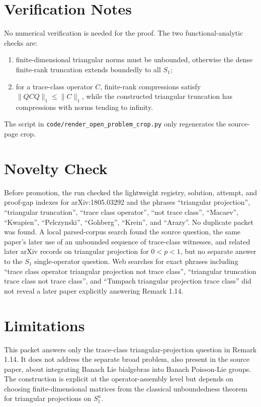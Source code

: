 \documentclass[11pt]{amsart}
\begin{document}
\section*{Verification Notes}

No numerical verification is needed for the proof. The two functional-analytic
checks are:
\begin{enumerate}
\item finite-dimensional triangular norms must be unbounded, otherwise the
dense finite-rank truncation extends boundedly to all \(S_1\);
\item for a trace-class operator \(C\), finite-rank compressions satisfy
\(\|Q C Q\|_1\le \|C\|_1\), while the constructed triangular truncation has
compressions with norms tending to infinity.
\end{enumerate}
The script in \texttt{code/render\_open\_problem\_crop.py} only regenerates
the source-page crop.

\section*{Novelty Check}

Before promotion, the run checked the lightweight registry, solution, attempt,
and proof-gap indexes for arXiv:1805.03292 and the phrases
``triangular projection'', ``triangular truncation'', ``trace class operator'',
``not trace class'', ``Macaev'', ``Kwapien'', ``Pelczynski'', ``Gohberg'',
``Krein'', and ``Arazy''. No duplicate packet was found. A local parsed-corpus
search found the source question, the same paper's later use of an unbounded
sequence of trace-class witnesses, and related later arXiv records on
triangular projection for \(0<p<1\), but no separate answer to the
\(S_1\) single-operator question. Web searches for exact phrases including
``trace class operator triangular projection not trace class'', ``triangular
truncation trace class not trace class'', and ``Tumpach triangular projection
trace class'' did not reveal a later paper explicitly answering Remark 1.14.

\section*{Limitations}

This packet answers only the trace-class triangular-projection question in
Remark 1.14. It does not address the separate broad problem, also present in
the source paper, about integrating Banach Lie bialgebras into Banach
Poisson-Lie groups. The construction is explicit at the operator-assembly
level but depends on choosing finite-dimensional matrices from the classical
unboundedness theorem for triangular projections on \(S_1^n\).
\end{document}
